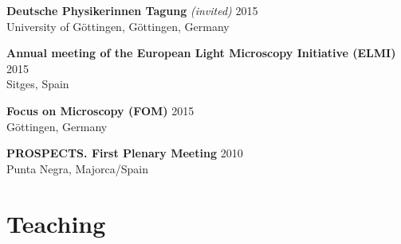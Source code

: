 \documentclass[margin,line]{res}
\begin{document}
\begin{resume}
\vspace*{-2.5mm}
{\bf Deutsche Physikerinnen Tagung} {\it (invited)}  \hfill 2015\\
University of Göttingen, Göttingen, Germany

\vspace*{-2.5mm}
{\bf Annual meeting of the European Light Microscopy Initiative (ELMI)}  \hfill 2015\\
Sitges, Spain%

\vspace*{-2.5mm}
{\bf Focus on Microscopy (FOM)}  \hfill 2015\\
Göttingen, Germany

\vspace*{-2.5mm}
{\bf PROSPECTS. First Plenary Meeting}   \hfill 2010\\
Punta Negra, Majorca/Spain


\section{\sc Teaching}


\end{resume}
\end{document}
